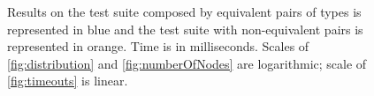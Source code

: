 \begin{figure}[t]
\centering
  
  \caption{Results on the test suite composed by equivalent pairs of
    types is represented in blue and the test suite with
    non-equivalent pairs is represented in orange. Time is in
    milliseconds.  Scales of \ref{fig:distribution} and
    \ref{fig:numberOfNodes} are logarithmic; scale of
    \ref{fig:timeouts} is linear.}
\label{fig:results}
\end{figure}
  
